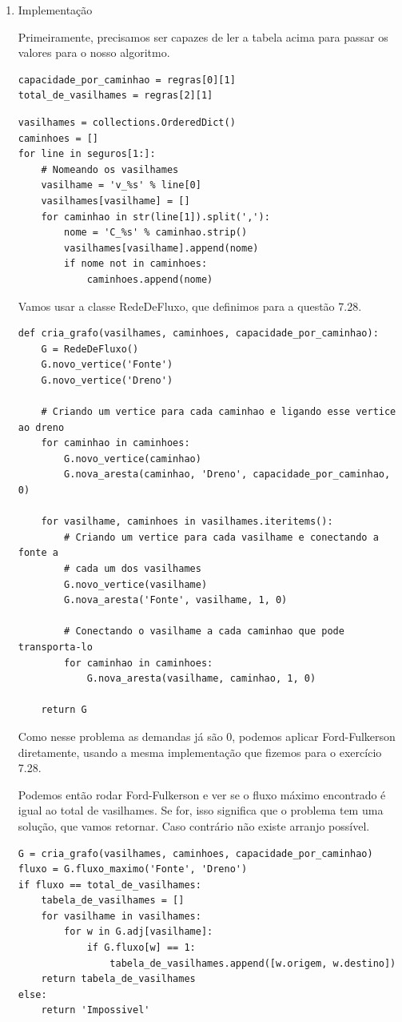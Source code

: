\documentclass[11pt]{article}
\begin{document}
\begin{enumerate}
\item Implementação
\label{sec-5-2-1-1}

Primeiramente, precisamos ser capazes de ler a tabela acima para
passar os valores para o nosso algoritmo.
\begin{verbatim}
capacidade_por_caminhao = regras[0][1]
total_de_vasilhames = regras[2][1]
\end{verbatim}

\begin{verbatim}
vasilhames = collections.OrderedDict()
caminhoes = []
for line in seguros[1:]:
    # Nomeando os vasilhames
    vasilhame = 'v_%s' % line[0]
    vasilhames[vasilhame] = []
    for caminhao in str(line[1]).split(','):
        nome = 'C_%s' % caminhao.strip()
        vasilhames[vasilhame].append(nome)
        if nome not in caminhoes:
            caminhoes.append(nome)
\end{verbatim}

Vamos usar a classe RedeDeFluxo, que definimos para a questão 7.28.

\begin{verbatim}
def cria_grafo(vasilhames, caminhoes, capacidade_por_caminhao):
    G = RedeDeFluxo()
    G.novo_vertice('Fonte')
    G.novo_vertice('Dreno')

    # Criando um vertice para cada caminhao e ligando esse vertice ao dreno
    for caminhao in caminhoes:
        G.novo_vertice(caminhao)
        G.nova_aresta(caminhao, 'Dreno', capacidade_por_caminhao, 0)

    for vasilhame, caminhoes in vasilhames.iteritems():
        # Criando um vertice para cada vasilhame e conectando a fonte a
        # cada um dos vasilhames
        G.novo_vertice(vasilhame)
        G.nova_aresta('Fonte', vasilhame, 1, 0)

        # Conectando o vasilhame a cada caminhao que pode transporta-lo
        for caminhao in caminhoes:
            G.nova_aresta(vasilhame, caminhao, 1, 0)

    return G
\end{verbatim}

Como nesse problema as demandas já são 0, podemos aplicar
Ford-Fulkerson diretamente, usando a mesma implementação que fizemos
para o exercício 7.28.

Podemos então rodar Ford-Fulkerson e ver se o fluxo máximo encontrado
é igual ao total de vasilhames. Se for, isso significa que o problema
tem uma solução, que vamos retornar. Caso contrário não existe arranjo
possível.
\begin{verbatim}
G = cria_grafo(vasilhames, caminhoes, capacidade_por_caminhao)
fluxo = G.fluxo_maximo('Fonte', 'Dreno')
if fluxo == total_de_vasilhames:
    tabela_de_vasilhames = []
    for vasilhame in vasilhames:
        for w in G.adj[vasilhame]:
            if G.fluxo[w] == 1:
                tabela_de_vasilhames.append([w.origem, w.destino])
    return tabela_de_vasilhames
else:
    return 'Impossivel'
\end{verbatim}


\end{enumerate}
\end{document}
